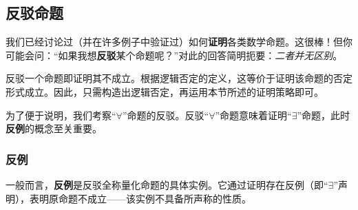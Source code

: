 \subsection{反驳命题}\label{sec:section4.9.7}

我们已经讨论过（并在许多例子中验证过）如何\textbf{证明}各类数学命题。这很棒！但你可能会问：``如果我想\textbf{反驳}某个命题呢？''对此的回答简明扼要：\emph{二者并无区别}。

反驳一个命题即证明其不成立。根据逻辑否定的定义，这等价于证明该命题的否定形式成立。因此，只需构造出逻辑否定，再运用本节所述的证明策略即可。

为了便于说明，我们考察``$\forall$''命题的反驳。反驳``$\forall$''命题意味着证明``$\exists$''命题，此时\textbf{反例}的概念至关重要。

\subsubsection*{反例}

一般而言，\textbf{反例}是反驳全称量化命题的具体实例。它通过证明存在反例（即``$\exists$''声明），表明原命题不成立——该实例不具备所声称的性质。

